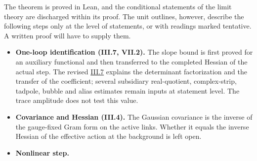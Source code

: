 \documentclass[
  letterpaper,
  11pt]{article}
\providecommand{\tightlist}{%
  \setlength{\itemsep}{0pt}\setlength{\parskip}{0pt}}
\begin{document}
The theorem is proved in Lean, and the conditional statements of the
limit theory are discharged within its proof. The unit outlines,
however, describe the following steps only at the level of statements,
or with readings marked tentative. A written proof will have to supply
them.

\begin{itemize}
\tightlist
\item
  \textbf{One-loop identification (III.7, VII.2).} The slope bound is
  first proved for an auxiliary functional and then transferred to the
  completed Hessian of the actual step. The revised
  \href{https://github.com/scottnarmstrong/yang-mills-informalization/blob/main/outline/units/III-7.md\#7-what-remains-unexplained}{III.7}
  explains the determinant factorization and the transfer of the
  coefficient; several subsidiary real-quotient, complex-strip, tadpole,
  bubble and alias estimates remain inputs at statement level. The trace
  amplitude does not test this value.
\item
  \textbf{Covariance and Hessian (III.4).} The Gaussian covariance is
  the inverse of the gauge-fixed Gram form on the active links. Whether
  it equals the inverse Hessian of the effective action at the
  background is left open.
\item
  \textbf{Nonlinear step.}


\end{itemize}
\end{document}
